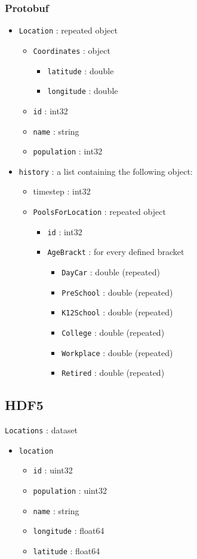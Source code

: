 \subsubsection{Protobuf}
\begin{itemize}
\item \texttt{Location} : repeated object
\begin{itemize}
\item \texttt{Coordinates} : object
\begin{itemize}
\item \texttt{latitude} : double
\item \texttt{longitude} : double
\end{itemize}
\item \texttt{id} : int32
\item \texttt{name} : string
\item \texttt{population} : int32
\end{itemize}
\end{itemize}
\begin{itemize}

\item \texttt{history} : a list containing the following object:
\begin{itemize}
\item{timestep} : int32
\item \texttt{PoolsForLocation} : repeated object
\begin{itemize}
\item \texttt{id} : int32
\item \texttt{AgeBrackt} : for every defined bracket
\begin{itemize}
\item \texttt{DayCar}	 : double (repeated)
\item \texttt{PreSchool} : double (repeated)
\item \texttt{K12School} : double (repeated)
\item \texttt{College}	 : double (repeated)
\item \texttt{Workplace} : double (repeated)
\item \texttt{Retired}	 : double (repeated)
\end{itemize}
\end{itemize}
\end{itemize}
\end{itemize}

\subsection{HDF5}
\texttt{Locations} : dataset
\begin{itemize}
\item \texttt{location}
\begin{itemize}
\item \texttt{id} : uint32
\item \texttt{population} : uint32
\item \texttt{name} : string
\item \texttt{longitude} : float64
\item \texttt{latitude} : float64
\end{itemize}
\end{itemize}

